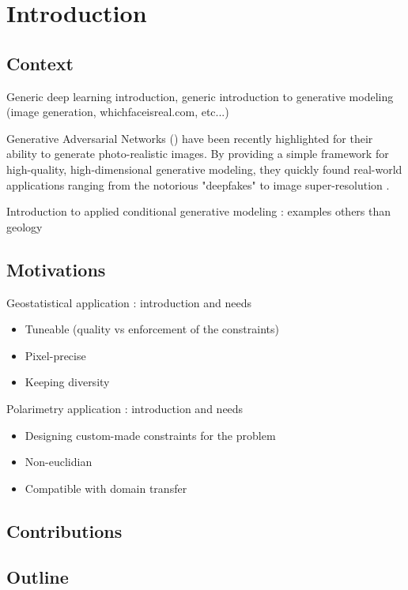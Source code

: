 \chapter*{Introduction}
\label{chap:intro}

\section*{Context}
Generic deep learning introduction, generic introduction to generative modeling (image generation, whichfaceisreal.com, etc...)

Generative Adversarial Networks (\GAN) \cite{Goodfellow2014} have been recently highlighted for their ability to generate photo-realistic images. By providing a simple framework for high-quality, high-dimensional generative modeling, they quickly found real-world applications ranging from the notorious "deepfakes" \cite{Vaccari2020} to image super-resolution \cite{Wang2020}.

Introduction to applied conditional generative modeling : examples others than geology

\section*{Motivations}
Geostatistical application :  introduction and needs \begin{itemize}
	\item Tuneable (quality vs enforcement of the constraints)
	\item Pixel-precise
	\item Keeping diversity
\end{itemize}

Polarimetry application : introduction and needs \begin{itemize}
	\item Designing custom-made constraints for the problem
	\item Non-euclidian
	\item Compatible with domain transfer
\end{itemize}

\section*{Contributions}

\section*{Outline}

